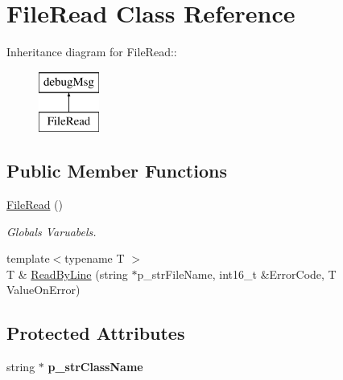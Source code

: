 \hypertarget{classFileRead}{
\section{FileRead Class Reference}
\label{classFileRead}
}
Inheritance diagram for FileRead::\begin{figure}[H]
\begin{center}
\leavevmode
\includegraphics[height=2cm]{classFileRead}
\end{center}
\end{figure}
\subsection*{Public Member Functions}
\begin{DoxyCompactItemize}
\item 
\hypertarget{classFileRead_ad19f0ae8129a9e0750f37ba4741ab32b}{
\hyperlink{classFileRead_ad19f0ae8129a9e0750f37ba4741ab32b}{FileRead} ()}
\label{classFileRead_ad19f0ae8129a9e0750f37ba4741ab32b}

\begin{DoxyCompactList}\small\item\em Globals Varuabels. \item\end{DoxyCompactList}\item 
{\footnotesize template$<$typename T $>$ }\\T \& \hyperlink{classFileRead_afd22580b16770d0abaf75c63098e6103}{ReadByLine} (string $\ast$p\_\-strFileName, int16\_\-t \&ErrorCode, T ValueOnError)
\end{DoxyCompactItemize}
\subsection*{Protected Attributes}
\begin{DoxyCompactItemize}
\item 
\hypertarget{classFileRead_a180c80b71e2a4f87e8eb034ffe52b7af}{
string $\ast$ {\bfseries p\_\-strClassName}}
\label{classFileRead_a180c80b71e2a4f87e8eb034ffe52b7af}

\end{DoxyCompactItemize}


